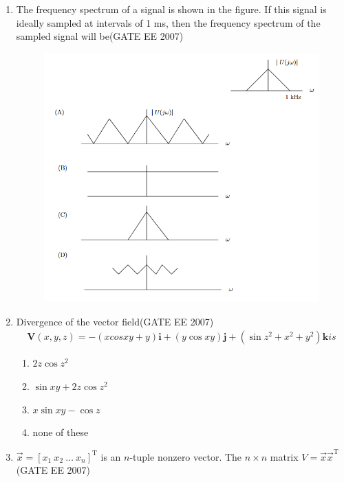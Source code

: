 \documentclass[a4paper,10pt]{exam}
\theoremstyle{remark}
\begin{document}
\begin{enumerate}
\vspace{0.5cm}

\newpage

\item  The frequency spectrum of a signal is shown in the figure. If this signal is ideally sampled at intervals of 1 ms, then the frequency spectrum of the sampled signal will be\hfill{(GATE EE 2007)} 

\begin{figure}[H]
    \centering
    \includegraphics[width=0.75\linewidth]{figs/Q 10.png}
\end{figure}

\item  Divergence of the vector field\hfill{(GATE EE 2007)} 
\begin{align}
\textbf{V}(x,y,z)=-(x cos xy+y)\textbf{i}+ 
(y \cos xy)\textbf{j}+(\sin z^2+x^2+y^2)\textbf{k} is        
\end{align}


\begin{multicols}{2}
\begin{enumerate}
\item $ 2z \cos z^{2}$
\item $\sin xy + 2z \cos z^{2}$
\item $ x \sin xy - \cos z$
\item none of these
\end{enumerate}
\end{multicols}
\vspace{0.5cm}

\noindent
\item  \quad $\vec{x} = [x_1\ x_2\ \ldots\ x_n]^{\mathrm{T}}$ is an $n$-tuple nonzero vector. The $n \times n$ matrix $V = \vec{x} \vec{x}^{\mathrm{T}}$ \hfill{(GATE EE 2007)} 


\end{enumerate}
\end{document}
